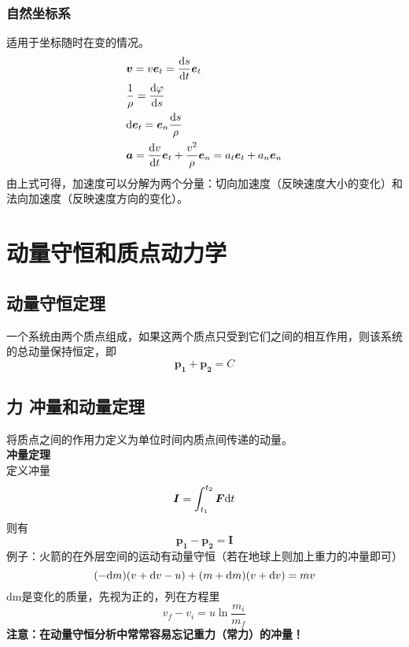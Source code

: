 \subsubsection{自然坐标系}
适用于坐标随时在变的情况。
\begin{align}
	&\bm{v}=v\bm{e}_t=\dfrac{\mathrm{d} s}{\mathrm{d} t}\bm{e}_t\\
	&\dfrac{1}{\rho}=\dfrac{\mathrm{d} \varphi}{\mathrm{d} s}\\
	&\mathrm{d} \bm{e}_t=\bm{e}_n\dfrac{\mathrm{d} s}{\rho}\\
	&\bm{a}=\dfrac{\mathrm{d} v}{\mathrm{d} t}\bm{e}_t+\dfrac{v^2}{\rho}\bm{e}_n=a_t\bm{e}_t+a_n\bm{e}_n
\end{align}
由上式可得，加速度可以分解为两个分量：切向加速度（反映速度大小的变化）和法向加速度（反映速度方向的变化）。

\section{动量守恒和质点动力学}
\subsection{动量守恒定理}
一个系统由两个质点组成，如果这两个质点只受到它们之间的相互作用，则该系统的总动量保持恒定，即
\begin{equation}\label{key}
	\bm{p_1}+\bm{p_2}=C
\end{equation}
\subsection{力 冲量和动量定理}
将质点之间的作用力定义为单位时间内质点间传递的动量。\\
\textbf{冲量定理} \\定义冲量
\begin{equation}\label{key}
	\bm{I}=\int_{t_1}^{t_2}\bm{F}\mathrm{d} t
\end{equation}
则有
\begin{equation}\label{key}
	\bm{p_1}-\bm{p_2}=\bm{I}
\end{equation}
例子：火箭的在外层空间的运动有动量守恒（若在地球上则加上重力的冲量即可）
\begin{equation}\label{key}
	(-\mathrm{d} m)(v+\mathrm{d} v-u)+(m+\mathrm{d} m)(v+\mathrm{d} v)=mv
\end{equation}
dm是变化的质量，先视为正的，列在方程里
\begin{equation}\label{key}
	v_f-v_i=u\ln\dfrac{m_i}{m_f}
\end{equation}
\textbf{注意：在动量守恒分析中常常容易忘记重力（常力）的冲量！}

